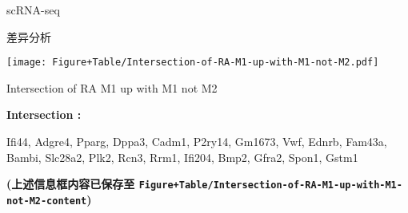 \documentclass[
  ignorenonframetext,
]{beamer}
\begin{document}
\begin{frame}[fragile]{scRNA-seq}
\begin{block}{差异分析}
\def\@captype{figure}
\begin{center}
\texttt{[image: Figure+Table/Intersection-of-RA-M1-up-with-M1-not-M2.pdf]}
\caption{Intersection of RA M1 up with M1 not M2}\label{fig:Intersection-of-RA-M1-up-with-M1-not-M2}
\end{center}
\begin{center}\begin{tcolorbox}[colback=gray!10, colframe=gray!50, width=0.9\linewidth, arc=1mm, boxrule=0.5pt]
\textbf{
Intersection
:}

\vspace{0.5em}

    Ifi44, Adgre4, Pparg, Dppa3, Cadm1, P2ry14, Gm1673,
Vwf, Ednrb, Fam43a, Bambi, Slc28a2, Plk2, Rcn3, Rrm1,
Ifi204, Bmp2, Gfra2, Spon1, Gstm1

\vspace{2em}
\end{tcolorbox}
\end{center}

\textbf{(上述信息框内容已保存至
\texttt{Figure+Table/Intersection-of-RA-M1-up-with-M1-not-M2-content})}
\end{block}
\end{frame}
\end{document}
